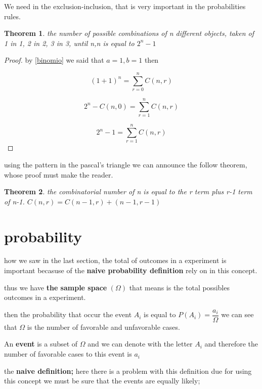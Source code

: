 \documentclass[10pt,a4paper]{article}
\newtheorem{theorem}{Theorem}[section]
\begin{document}
We need in the exclusion-inclusion, that is very important in the probabilities rules. 





\begin{theorem}
the number of possible combinations of  n different objects, taken of 1 in 1, 2 in 2, 3 in 3, until n,n is equal to $2^{n}-1$



\end{theorem}

\begin{proof}


by \ref{binomio} we said that $a=1,b=1$ then

$$(1+1)^{n}=\sum_{r=0}^{n}C(n,r)$$

$$2^{n}-C(n,0)=\sum_{r=1}^{n}C(n,r)$$

$$2^{n}-1=\sum_{r=1}^{n}C(n,r)$$

\end{proof}


using the pattern in the pascal's triangle we can announce the follow theorem, whose proof must make the reader.

\begin{theorem}

the combinatorial number of n is equal to the r term plus r-1 term of n-1. $C(n,r)=C(n-1,r)+(n-1,r-1)$


\end{theorem}


\section*{probability}

how we saw in the last section, the total of outcomes in a experiment is important becasuse of the \textbf{naive probability definition} rely on in this concept. 

thus we have \textbf{the sample space } $(\Omega)$ that means is the total possibles outcomes in a experiment.

then the probability that occur the event $A_{i}$ is equal to $P(A_{i})=\dfrac{a_{i}}{\Omega}$ we can see that $\Omega$ is the number of favorable and unfavorable cases.

An \textbf{event} is a subset of $\Omega$ and we can denote with the letter $A_{i}$  and therefore the number of favorable cases to this event is $a_{i}$

the \textbf{naive definition;} here there is a problem with this definition due for using this concept we must be sure that the events are equally likely; 
\end{document}
